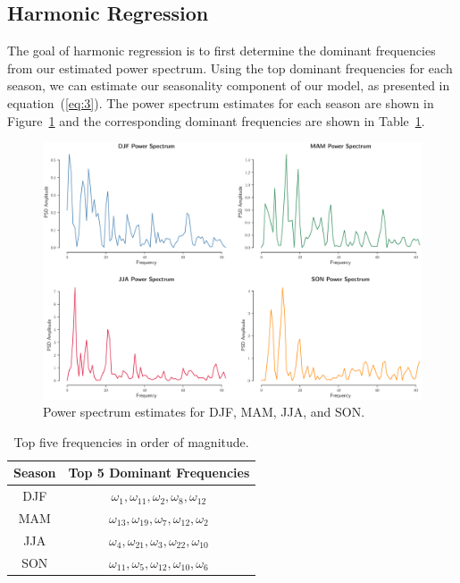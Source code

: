 \documentclass[12pt]{article}
\begin{document}
\subsection{Harmonic Regression}
The goal of harmonic regression is to first determine the dominant frequencies from our estimated power spectrum. Using the top dominant frequencies for each season, we can estimate our seasonality component of our model, as presented in equation~(\ref{eq:3}). The  power spectrum estimates for each season are shown in Figure~\ref{psd} and the corresponding dominant frequencies are shown in Table~\ref{top_freqs}. 
\begin{figure}[H]
  \centering
  \includegraphics[width=1\textwidth,center]{figs/psd}
  \caption{Power spectrum estimates for DJF, MAM, JJA, and SON.}\label{psd}
\end{figure}
\begin{table}[H]
\centering
\begin{tabular}{|c|c|}
\hline
\textbf{Season}       & \textbf{Top 5 Dominant Frequencies} \\ \hline\hline
DJF & $\omega_1, \omega_{11}, \omega_2, \omega_8, \omega_{12}$ \\ \hline
MAM & $\omega_{13}, \omega_{19}, \omega_7, \omega_{12}, \omega_{2}$ \\ \hline
JJA & $\omega_4, \omega_{21}, \omega_3, \omega_{22}, \omega_{10}$ \\ \hline
SON & $\omega_{11}, \omega_{5}, \omega_{12}, \omega_{10}, \omega_{6}$ \\ \hline
\end{tabular}
\caption{Top five frequencies in order of magnitude.}\label{top_freqs}
\end{table}
\end{document}
